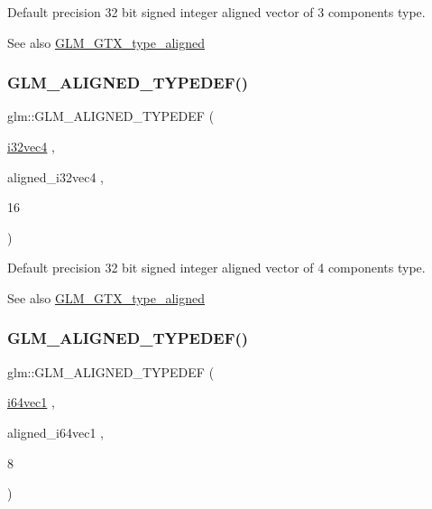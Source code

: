 Default precision 32 bit signed integer aligned vector of 3 components type. \begin{DoxySeeAlso}{See also}
\mbox{\hyperlink{group__gtx__type__aligned}{G\+L\+M\+\_\+\+G\+T\+X\+\_\+type\+\_\+aligned}} 
\end{DoxySeeAlso}
\mbox{\label{group__gtx__type__aligned_gad2ecbdea18732163e2636e27b37981ee}} 
\subsubsection{\texorpdfstring{GLM\_ALIGNED\_TYPEDEF()}{GLM\_ALIGNED\_TYPEDEF()}\hspace{0.1cm}{\footnotesize\ttfamily [64/209]}}
{\footnotesize\ttfamily glm\+::\+G\+L\+M\+\_\+\+A\+L\+I\+G\+N\+E\+D\+\_\+\+T\+Y\+P\+E\+D\+EF (\begin{DoxyParamCaption}\item[{\mbox{\hyperlink{group__gtc__type__precision_ga3ada3676600db65a425058c0a150d83e}{i32vec4}}}]{,  }\item[{aligned\+\_\+i32vec4}]{,  }\item[{16}]{ }\end{DoxyParamCaption})}

Default precision 32 bit signed integer aligned vector of 4 components type. \begin{DoxySeeAlso}{See also}
\mbox{\hyperlink{group__gtx__type__aligned}{G\+L\+M\+\_\+\+G\+T\+X\+\_\+type\+\_\+aligned}} 
\end{DoxySeeAlso}
\mbox{\label{group__gtx__type__aligned_ga965b1c9aa1800e93d4abc2eb2b5afcbf}} 
\subsubsection{\texorpdfstring{GLM\_ALIGNED\_TYPEDEF()}{GLM\_ALIGNED\_TYPEDEF()}\hspace{0.1cm}{\footnotesize\ttfamily [65/209]}}
{\footnotesize\ttfamily glm\+::\+G\+L\+M\+\_\+\+A\+L\+I\+G\+N\+E\+D\+\_\+\+T\+Y\+P\+E\+D\+EF (\begin{DoxyParamCaption}\item[{\mbox{\hyperlink{group__gtc__type__precision_ga7ee2c91a98ebd719ae26e15ad89106de}{i64vec1}}}]{,  }\item[{aligned\+\_\+i64vec1}]{,  }\item[{8}]{ }\end{DoxyParamCaption})}


